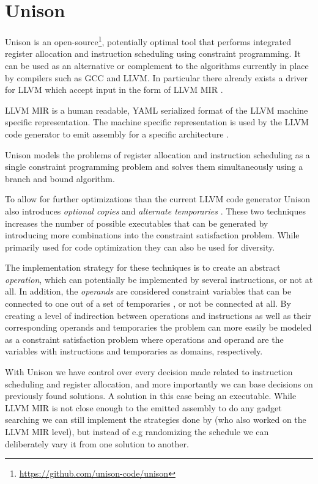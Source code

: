 \section{Unison}
\label{sec:unison}

Unison is an open-source\footnote{\url{https://github.com/unison-code/unison}},
potentially optimal tool that performs integrated register allocation and instruction
scheduling using constraint programming. It can be used as an alternative or complement to
the algorithms currently in place by compilers such as GCC and LLVM. In particular there
already exists a driver for LLVM which accept input in the form of LLVM MIR \cite{unison-docs}.

LLVM MIR is a human readable, YAML serialized format of the LLVM machine specific
representation\cite{llvm-mir-lang-ref}. The machine specific representation is used by the
LLVM code generator to emit assembly for a specific architecture \cite{welcome-to-backend}.

Unison models the problems of register allocation and instruction scheduling as a single
constraint programming problem and solves them simultaneously using a branch and bound
algorithm\cite{unison-docs,reg-alloc-inst-sched-uni,unison-src}.

To allow for further optimizations than the current LLVM code generator Unison also
introduces \textit{optional copies} and \textit{alternate temporaries}
\cite{reg-alloc-inst-sched-uni}. These two techniques increases the number of possible
executables that can be generated by introducing more combinations into the constraint
satisfaction problem. While primarily used for code optimization they can also be used for
diversity.

The implementation strategy for these techniques is to create an abstract \textit{operation},
which can potentially be implemented by several instructions, or not at all. In addition,
the \textit{operands} are considered constraint variables that can be connected to one out
of a set of temporaries \cite{unison-docs}, or not be connected at all. By creating a
level of indirection between operations and instructions as well as their corresponding
operands and temporaries the problem can more easily be modeled as a constraint
satisfaction problem where operations and operand are the variables with instructions and
temporaries as domains, respectively.

With Unison we have control over every decision made related to instruction scheduling and
register allocation, and more importantly we can base decisions on previously found solutions.
A solution in this case being an executable. While LLVM MIR is not close enough to the
emitted assembly to do any gadget searching we can still implement the strategies done by
\textcite{large-scale-automated} (who also worked on the LLVM MIR level), but instead of
e.g randomizing the schedule we can deliberately vary it from one solution to another.
